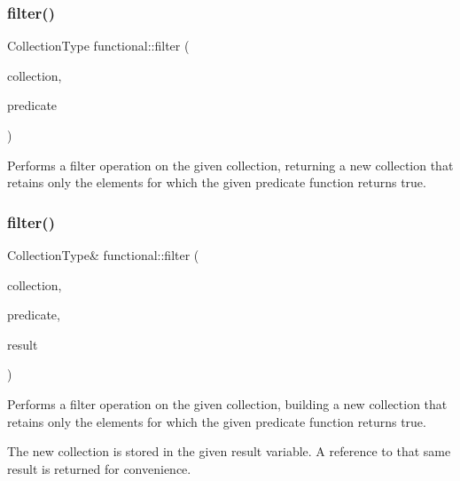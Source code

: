 \subsubsection{\texorpdfstring{filter()}{filter()}\hspace{0.1cm}{\footnotesize\ttfamily [1/2]}}
{\footnotesize\ttfamily Collection\+Type functional\+::filter (\begin{DoxyParamCaption}\item[{Collection\+Type}]{collection,  }\item[{std\+::function$<$ bool(const Element\+Type \&)$>$}]{predicate }\end{DoxyParamCaption})}



Performs a filter operation on the given collection, returning a new collection that retains only the elements for which the given predicate function returns true. 

\mbox{\label{namespacefunctional_a842a5adba549e33315c451238f6bb6aa}} 
\subsubsection{\texorpdfstring{filter()}{filter()}\hspace{0.1cm}{\footnotesize\ttfamily [2/2]}}
{\footnotesize\ttfamily Collection\+Type\& functional\+::filter (\begin{DoxyParamCaption}\item[{Collection\+Type}]{collection,  }\item[{std\+::function$<$ bool(const Element\+Type \&)$>$}]{predicate,  }\item[{Collection\+Type \&}]{result }\end{DoxyParamCaption})}



Performs a filter operation on the given collection, building a new collection that retains only the elements for which the given predicate function returns true. 

The new collection is stored in the given \textquotesingle{}result\textquotesingle{} variable. A reference to that same result is returned for convenience. \mbox{\label{namespacefunctional_a101598b614dde8ff3020b779fec982df}} 
